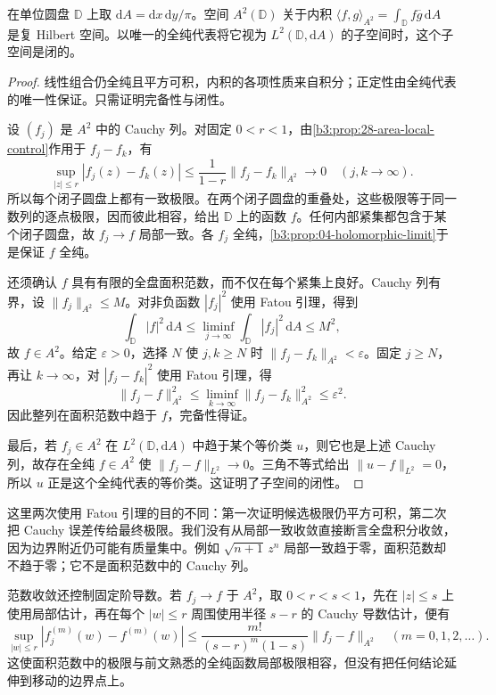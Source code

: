 \begin{theorem}\label{b3:thm:28-bergman-complete}
在单位圆盘 \(\mathbb D\) 上取 \(\mathrm{d}A=\mathrm{d}x\,\mathrm{d}y/\pi\)。空间 \(A^2(\mathbb D)\) 关于内积 \(\langle f,g\rangle_{A^2}=\int_{\mathbb D}f\overline g\,\mathrm{d}A\) 是复 Hilbert 空间。以唯一的全纯代表将它视为 \(L^2(\mathbb D,\mathrm{d}A)\) 的子空间时，这个子空间是闭的。
\end{theorem}
\begin{proof}
线性组合仍全纯且平方可积，内积的各项性质来自积分；正定性由全纯代表的唯一性保证。只需证明完备性与闭性。

设 \((f_j)\) 是 \(A^2\) 中的 Cauchy 列。对固定 \(0<r<1\)，由\cref{b3:prop:28-area-local-control}作用于 \(f_j-f_k\)，有
\[
 \sup_{|z|\le r}|f_j(z)-f_k(z)|
 \le\frac1{1-r}\|f_j-f_k\|_{A^2}\longrightarrow0
 \quad(j,k\to\infty).
\]
所以每个闭子圆盘上都有一致极限。在两个闭子圆盘的重叠处，这些极限等于同一数列的逐点极限，因而彼此相容，给出 \(\mathbb D\) 上的函数 \(f\)。任何内部紧集都包含于某个闭子圆盘，故 \(f_j\to f\) 局部一致。各 \(f_j\) 全纯，\cref{b3:prop:04-holomorphic-limit}于是保证 \(f\) 全纯。

还须确认 \(f\) 具有有限的全盘面积范数，而不仅在每个紧集上良好。Cauchy 列有界，设 \(\|f_j\|_{A^2}\le M\)。对非负函数 \(|f_j|^2\) 使用 Fatou 引理，得到
\[
 \int_{\mathbb D}|f|^2\,\mathrm{d}A
 \le\liminf_{j\to\infty}\int_{\mathbb D}|f_j|^2\,\mathrm{d}A
 \le M^2,
\]
故 \(f\in A^2\)。给定 \(\varepsilon>0\)，选择 \(N\) 使 \(j,k\ge N\) 时 \(\|f_j-f_k\|_{A^2}<\varepsilon\)。固定 \(j\ge N\)，再让 \(k\to\infty\)，对 \(|f_j-f_k|^2\) 使用 Fatou 引理，得
\[
 \|f_j-f\|_{A^2}^2
 \le\liminf_{k\to\infty}\|f_j-f_k\|_{A^2}^2
 \le\varepsilon^2.
\]
因此整列在面积范数中趋于 \(f\)，完备性得证。

最后，若 \(f_j\in A^2\) 在 \(L^2(\mathbb D,\mathrm{d}A)\) 中趋于某个等价类 \(u\)，则它也是上述 Cauchy 列，故存在全纯 \(f\in A^2\) 使 \(\|f_j-f\|_{L^2}\to0\)。三角不等式给出 \(\|u-f\|_{L^2}=0\)，所以 \(u\) 正是这个全纯代表的等价类。这证明了子空间的闭性。
\end{proof}

这里两次使用 Fatou 引理的目的不同：第一次证明候选极限仍平方可积，第二次把 Cauchy 误差传给最终极限。我们没有从局部一致收敛直接断言全盘积分收敛，因为边界附近仍可能有质量集中。例如 \(\sqrt{n+1}\,z^n\) 局部一致趋于零，面积范数却不趋于零；它不是面积范数中的 Cauchy 列。

\ProseParagraphBreak

范数收敛还控制固定阶导数。若 \(f_j\to f\) 于 \(A^2\)，取 \(0<r<s<1\)，先在 \(|z|\le s\) 上使用局部估计，再在每个 \(|w|\le r\) 周围使用半径 \(s-r\) 的 Cauchy 导数估计，便有
\[
 \sup_{|w|\le r}|f_j^{(m)}(w)-f^{(m)}(w)|
 \le\frac{m!}{(s-r)^m(1-s)}\|f_j-f\|_{A^2}
 \quad(m=0,1,2,\ldots).
\]
这使面积范数中的极限与前文熟悉的全纯函数局部极限相容，但没有把任何结论延伸到移动的边界点上。

